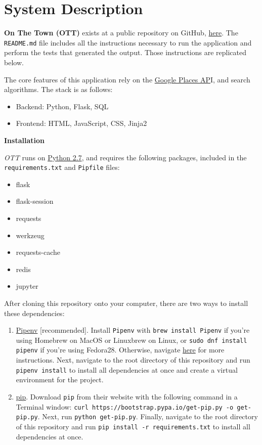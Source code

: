\documentclass[11pt]{article}
\begin{document}
\newpage

\appendix

\section{System Description}

\textbf{On The Town (OTT)} exists at a public repository on GitHub, \href{https://github.com/acamara1498/OTT}{here}. The \texttt{README.md} file includes all the instructions necessary to run the application and perform the tests that generated the output. Those instructions are replicated below.

The core features of this application rely on the \href{https://developers.google.com/places/web-service/intro}{Google Places AP}I, and search algorithms. The stack is as follows:
\begin{itemize}
    \item Backend: Python, Flask, SQL
    \item Frontend: HTML, JavaScript, CSS, Jinja2
\end{itemize}

\textbf{Installation}

\emph{OTT} runs on \href{https://www.python.org/download/releases/2.7/}{Python 2.7}, and requires the following packages, included in the \texttt{requirements.txt} and \texttt{Pipfile} files:
\begin{itemize}
    \item flask
    \item flask-session
    \item requests
    \item werkzeug
    \item requests-cache
    \item redis
    \item jupyter
\end{itemize}

After cloning this repository onto your computer, there are two ways to install these dependencies:
\begin{enumerate}
    \item \href{https://pipenv.readthedocs.io/}{Pipenv} [recommended]. Install \texttt{Pipenv} with \texttt{brew install Pipenv} if you're using Homebrew on MacOS or Linuxbrew on Linux, or \texttt{sudo dnf install pipenv} if you're using Fedora28. Otherwise, navigate \href{https://pipenv.readthedocs.io/en/latest/install/#installing-pipenv}{here} for more instructions. Next, navigate to the root directory of this repository and run \texttt{pipenv install} to install all dependencies at once and create a virtual environment for the project.
    \item \href{https://pip.pypa.io/en/stable/#}{pip}. Download \texttt{pip} from their website with the following command in a Terminal window: \texttt{curl https://bootstrap.pypa.io/get-pip.py -o get-pip.py}. Next, run \texttt{python get-pip.py}. Finally, navigate to the root directory of this repository and run \texttt{pip install -r requirements.txt} to install all dependencies at once.
\end{enumerate}
\end{document}
